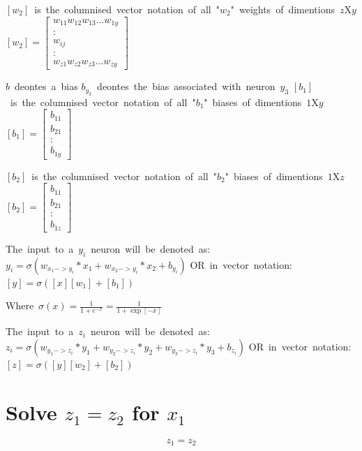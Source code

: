 \documentclass{article}
\begin{document}
\vspace{2mm}
\hbox{$[w_2]$ is the columnised vector notation of all "$w_2$" weights of dimentions $z$X$y$}
\hbox{$[w_2] = [
    \begin{matrix}
        w_{11} w_{12} w_{13} ... w_{1y} \\
        :\\
        w_{ij}\\
        :\\
        w_{z1} w_{z2} w_{z3} ... w_{zy}
    \end{matrix}
]$}


\vspace{4mm}
\hbox{$b$ deontes a bias}
\hbox{$b_{y_3}$ deontes the bias associated with neuron $y_3$}
\hbox{$[b_1]$ is the columnised vector notation of all "$b_1$" biases of dimentions $1$X$y$ }
\hbox{$[b_1] = [
    \begin{matrix}
        b_{11}\\
        b_{21}\\
        :\\
        b_{1y}
    \end{matrix}
]$}

\vspace{2mm}
\hbox{$[b_2]$ is the columnised vector notation of all "$b_2$" biases of dimentions $1$X$z$ }
\hbox{$[b_2] = [
    \begin{matrix}
        b_{11}\\
        b_{21}\\
        :\\
        b_{1z}
    \end{matrix}
]$}

\vspace{5mm}
\hbox{The input to a $y_i$ neuron will be denoted as:}
\hbox{$y_i = \sigma(w_{x_1->y_i} * x_1 + w_{x_2->y_i} * x_2 + b_{y_i} )$}
\hbox{OR in vector notation:}
\hbox{$[y] = \sigma([x][w_1] + [b_1])$}

\vspace{2mm}
\hbox{Where $\sigma(x) = \frac{1}{1+e^{-x}} = \frac{1}{1+\exp[-x]}$}

\vspace{5mm}
\hbox{The input to a $z_i$ neuron will be denoted as:}
\hbox{$z_i = \sigma(w_{y_1->z_i}*y_1 + w_{y_2->z_i}*y_2 + w_{y_3->z_i}*y_3 + b_{z_i} )$}
\hbox{OR in vector notation:}
\hbox{$[z] = \sigma([y][w_2] + [b_2])$}





\section{Solve $z_1 = z_2$ for $x_1$}
\begin{equation}
    z_1 = z_2    
\end{equation}
\end{document}
